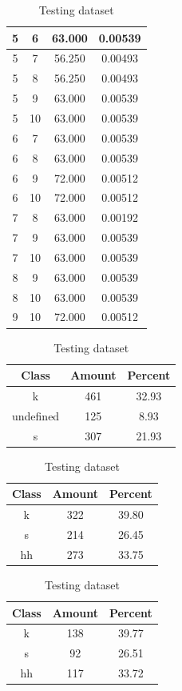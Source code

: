 \begin{table}
\begin{subtable}[tbp]{0.45\textwidth}
{\begin{tabular}{|c|c|c|c|}
 5 & 6 & 63.000 & 0.00539\\ \hline 
 5 & 7 & 56.250 & 0.00493\\ \hline 
 5 & 8 & 56.250 & 0.00493\\ \hline 
 5 & 9 & 63.000 & 0.00539\\ \hline 
 5 & 10 & 63.000 & 0.00539\\ \hline 
 6 & 7 & 63.000 & 0.00539\\ \hline 
 6 & 8 & 63.000 & 0.00539\\ \hline 
 6 & 9 & 72.000 & 0.00512\\ \hline 
 6 & 10 & 72.000 & 0.00512\\ \hline 
 7 & 8 & 63.000 & 0.00192\\ \hline 
 7 & 9 & 63.000 & 0.00539\\ \hline 
 7 & 10 & 63.000 & 0.00539\\ \hline 
 8 & 9 & 63.000 & 0.00539\\ \hline 
 8 & 10 & 63.000 & 0.00539\\ \hline 
 9 & 10 & 72.000 & 0.00512\\ \hline 

\end{tabular}
} \label{xlsskew2010}
\caption{xcsskew2010}
\end{subtable}

\begin{subtable}[tbp]{0.45\textwidth}
\centering
\begin{tabular}{|c|c|c|}
\hline
Class & Amount & Percent\\ \hline
k & 461 & 32.93\\ \hline
undefined & 125 & 8.93\\ \hline
s & 307 & 21.93\\ \hline
\end{tabular}
\caption{Entire dataset after stripping short sounds}
\end{subtable}
\hfill
\begin{subtable}[tbp]{0.45\textwidth}
\centering
\begin{tabular}{|c|c|c|}
\hline
Class & Amount & Percent\\ \hline
k & 322 & 39.80\\ \hline
s & 214 & 26.45\\ \hline
hh & 273 & 33.75\\ \hline
\end{tabular}
\caption{Training dataset}
\end{subtable}
\hfill
\begin{subtable}[tbp]{0.45\textwidth}
\centering
\begin{tabular}{|c|c|c|}
\hline
Class & Amount & Percent\\ \hline
k & 138 & 39.77\\ \hline
s & 92 & 26.51\\ \hline
hh & 117 & 33.72\\ \hline
\end{tabular}
\caption{Testing dataset}
\end{subtable}
\hfill


\end{table}
